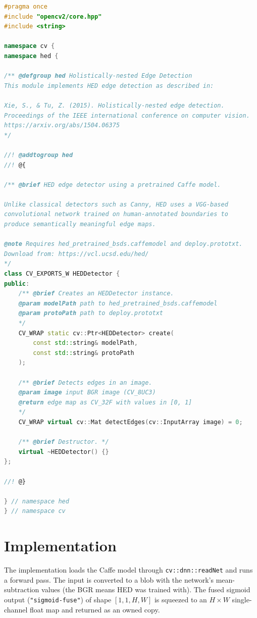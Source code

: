 \documentclass[11pt]{article}
\begin{document}
\begin{lstlisting}[language=C++, caption={include/opencv2/hed.hpp}]
#pragma once
#include "opencv2/core.hpp"
#include <string>

namespace cv {
namespace hed {

/** @defgroup hed Holistically-nested Edge Detection
This module implements HED edge detection as described in:

Xie, S., & Tu, Z. (2015). Holistically-nested edge detection.
Proceedings of the IEEE international conference on computer vision.
https://arxiv.org/abs/1504.06375
*/

//! @addtogroup hed
//! @{

/** @brief HED edge detector using a pretrained Caffe model.

Unlike classical detectors such as Canny, HED uses a VGG-based
convolutional network trained on human-annotated boundaries to
produce semantically meaningful edge maps.

@note Requires hed_pretrained_bsds.caffemodel and deploy.prototxt.
Download from: https://vcl.ucsd.edu/hed/
*/
class CV_EXPORTS_W HEDDetector {
public:
    /** @brief Creates an HEDDetector instance.
    @param modelPath path to hed_pretrained_bsds.caffemodel
    @param protoPath path to deploy.prototxt
    */
    CV_WRAP static cv::Ptr<HEDDetector> create(
        const std::string& modelPath,
        const std::string& protoPath
    );

    /** @brief Detects edges in an image.
    @param image input BGR image (CV_8UC3)
    @return edge map as CV_32F with values in [0, 1]
    */
    CV_WRAP virtual cv::Mat detectEdges(cv::InputArray image) = 0;

    /** @brief Destructor. */
    virtual ~HEDDetector() {}
};

//! @}

} // namespace hed
} // namespace cv
\end{lstlisting}

\section{Implementation}

The implementation loads the Caffe model through \texttt{cv::dnn::readNet} and runs
a forward pass. The input is converted to a blob with the network's mean-subtraction
values (the BGR means HED was trained with). The fused sigmoid output
(\texttt{"sigmoid-fuse"}) of shape $[1,1,H,W]$ is squeezed to an $H\times W$
single-channel float map and returned as an owned copy.
\end{document}
